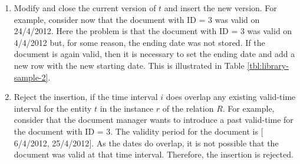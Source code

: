 \begin{enumerate}
\begin{enumerate}
	\item Modify and close the current version of $t$ and insert the new version. For example, consider now that the document with ID = 3 was valid on 24/4/2012. Here the problem is that the document with ID = 3 was valid on 4/4/2012 but, for some reason, the ending date was not stored. If the document is again valid, then it is necessary to set the ending date and add a new row with the new starting date. This is illustrated in Table \ref{tbl:library-sample-2}.
	\item Reject the insertion, if the time interval $i$ does overlap any existing valid-time interval for the entity $t$ in the instance $r$ of the relation $R$. For example, consider that the document manager wants to introduce a past valid-time for the document with ID = 3. The validity period for the document is $[$6/4/2012, 25/4/2012$]$. As the dates do overlap, it is not possible that the document was valid at that time interval. Therefore, the insertion is rejected.
% 


	\end{enumerate}

\end{enumerate}


